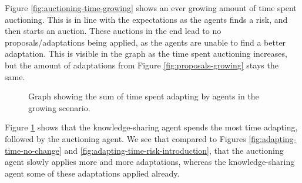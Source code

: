 Figure \ref{fig:auctioning-time-growing} shows an ever growing amount of time spent auctioning. This is in line with the expectations as the agents finds a risk, and then starts an auction. These auctions in the end lead to no proposals/adaptations being applied, as the agents are unable to find a better adaptation. This is visible in the graph as the time spent auctioning increases, but the amount of adaptations from Figure \ref{fig:proposals-growing} stays the same.

\begin{figure}[H]
    \hspace*{-1.2cm}
    \centering
        
    \caption{Graph showing the sum of time spent adapting by agents in the growing scenario.}
    \label{fig:adapting-time-growing}
\end{figure}

Figure \ref{fig:adapting-time-growing} shows that the knowledge-sharing agent spends the most time adapting, followed by the auctioning agent. We see that compared to Figures \ref{fig:adapting-time-no-change} and \ref{fig:adapting-time-risk-introduction}, that the auctioning agent slowly applies more and more adaptations, whereas the knowledge-sharing agent some of these adaptations applied already. 
